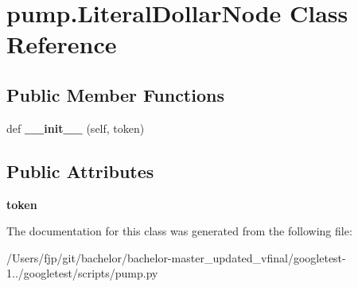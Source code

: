 \hypertarget{classpump_1_1_literal_dollar_node}{}\section{pump.\+Literal\+Dollar\+Node Class Reference}
\label{classpump_1_1_literal_dollar_node}
\subsection*{Public Member Functions}
\begin{DoxyCompactItemize}
\item 
\mbox{\label{classpump_1_1_literal_dollar_node_a181cccad8a48f7dfdd0716e427897e0b}} 
def {\bfseries \+\_\+\+\_\+init\+\_\+\+\_\+} (self, token)
\end{DoxyCompactItemize}
\subsection*{Public Attributes}
\begin{DoxyCompactItemize}
\item 
\mbox{\label{classpump_1_1_literal_dollar_node_ab4c6e209635b8868bcdf0fe8053431c6}} 
{\bfseries token}
\end{DoxyCompactItemize}


The documentation for this class was generated from the following file\+:\begin{DoxyCompactItemize}
\item 
/\+Users/fjp/git/bachelor/bachelor-\/master\+\_\+updated\+\_\+vfinal/googletest-\/1../googletest/scripts/pump.\+py\end{DoxyCompactItemize}
